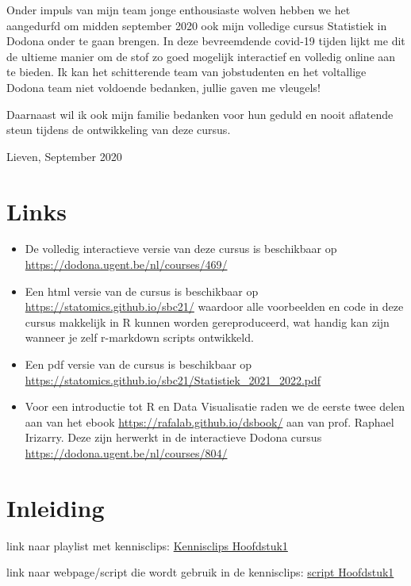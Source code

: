 \documentclass[
  12pt,dutch,coursenotes]{book}
\theoremstyle{definition}
\theoremstyle{definition}
\theoremstyle{definition}
\theoremstyle{definition}
\theoremstyle{remark}
\begin{document}
Onder impuls van mijn team jonge enthousiaste wolven hebben we het aangedurfd om midden september 2020 ook mijn volledige cursus Statistiek in Dodona onder te gaan brengen. In deze bevreemdende covid-19 tijden lijkt me dit de ultieme manier om de stof zo goed mogelijk interactief en volledig online aan te bieden.
Ik kan het schitterende team van jobstudenten en het voltallige Dodona team niet voldoende bedanken, jullie gaven me vleugels!

Daarnaast wil ik ook mijn familie bedanken voor hun geduld en nooit aflatende steun tijdens de ontwikkeling van deze cursus.

Lieven, September 2020

\hypertarget{links}{%
\chapter*{Links}\label{links}}

\begin{itemize}
\item
  De volledig interactieve versie van deze cursus is beschikbaar op \url{https://dodona.ugent.be/nl/courses/469/}
\item
  Een html versie van de cursus is beschikbaar op \url{https://statomics.github.io/sbc21/} waardoor alle voorbeelden en code in deze cursus makkelijk in R kunnen worden gereproduceerd, wat handig kan zijn wanneer je zelf r-markdown scripts ontwikkeld.
\item
  Een pdf versie van de cursus is beschikbaar op \url{https://statomics.github.io/sbc21/Statistiek_2021_2022.pdf}
\item
  Voor een introductie tot R en Data Visualisatie raden we de eerste twee delen aan van het ebook \url{https://rafalab.github.io/dsbook/} aan van prof. Raphael Irizarry. Deze zijn herwerkt in de interactieve Dodona cursus \url{https://dodona.ugent.be/nl/courses/804/}
\end{itemize}

\hypertarget{inleiding}{%
\chapter{Inleiding}\label{inleiding}}

link naar playlist met kennisclips:
\href{https://www.youtube.com/playlist?list=PLZH1hP8_LbJIk4G2AZYYKvgZLjRR-1-Iw}{Kennisclips Hoofdstuk1}

link naar webpage/script die wordt gebruik in de kennisclips: \href{https://statomics.github.io/sbc21/rmd/01-intro.html}{script Hoofdstuk1}
\end{document}
